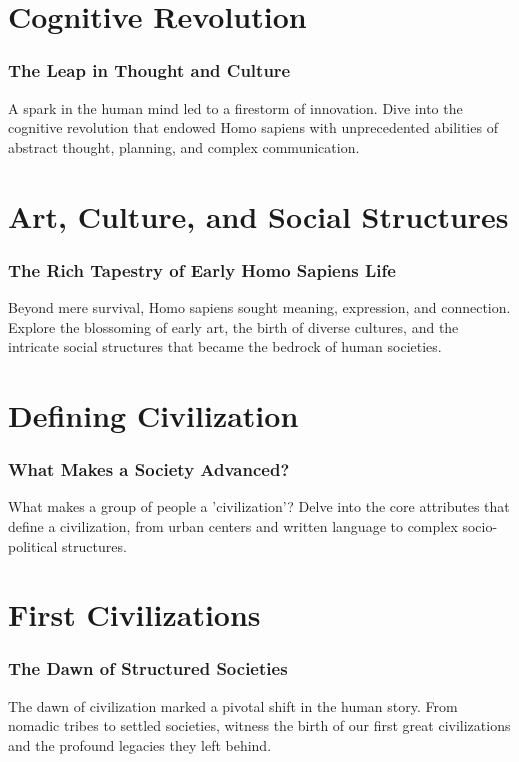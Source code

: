 \documentclass[a4paper,12pt]{book}
\begin{document}
\chapter{Cognitive Revolution}
\subsection*{The Leap in Thought and Culture}
A spark in the human mind led to a firestorm of innovation. Dive into the cognitive revolution that endowed Homo sapiens with unprecedented abilities of abstract thought, planning, and complex communication.

\chapter{Art, Culture, and Social Structures}
\subsection*{The Rich Tapestry of Early Homo Sapiens Life}
Beyond mere survival, Homo sapiens sought meaning, expression, and connection. Explore the blossoming of early art, the birth of diverse cultures, and the intricate social structures that became the bedrock of human societies.

\chapter{Defining Civilization}
\subsection*{What Makes a Society Advanced?}
What makes a group of people a 'civilization'? Delve into the core attributes that define a civilization, from urban centers and written language to complex socio-political structures.

\chapter{First Civilizations}
\subsection*{The Dawn of Structured Societies}
The dawn of civilization marked a pivotal shift in the human story. From nomadic tribes to settled societies, witness the birth of our first great civilizations and the profound legacies they left behind.
\end{document}
